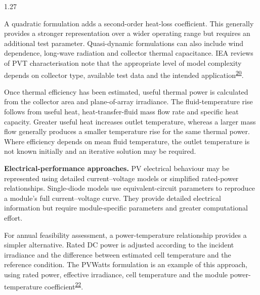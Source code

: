 \documentclass[12pt,letterpaper]{article}
\DeclareRobustCommand{\citenum}[1]{\hyperlink{ref:#1}{#1}} %
\begin{document}
\begin{spacing}{1.27}
\vspace{0.15in}

A quadratic formulation adds a second-order heat-loss coefficient. This generally provides a stronger representation over a wider operating range but requires an additional test parameter. Quasi-dynamic formulations can also include wind dependence, long-wave radiation and collector thermal capacitance. IEA reviews of PVT characterisation note that the appropriate level of model complexity depends on collector type, available test data and the intended application\textsuperscript{\citenum{20}}.\par

\vspace{0.15in}

Once thermal efficiency has been estimated, useful thermal power is calculated from the collector area and plane-of-array irradiance. The fluid-temperature rise follows from useful heat, heat-transfer-fluid mass flow rate and specific heat capacity. Greater useful heat increases outlet temperature, whereas a larger mass flow generally produces a smaller temperature rise for the same thermal power. Where efficiency depends on mean fluid temperature, the outlet temperature is not known initially and an iterative solution may be required.\par

\vspace{0.15in}

\textbf{Electrical-performance approaches.} PV electrical behaviour may be represented using detailed current--voltage models or simplified rated-power relationships. Single-diode models use equivalent-circuit parameters to reproduce a module's full current--voltage curve. They provide detailed electrical information but require module-specific parameters and greater computational effort.\par

\vspace{0.15in}

For annual feasibility assessment, a power-temperature relationship provides a simpler alternative. Rated DC power is adjusted according to the incident irradiance and the difference between estimated cell temperature and the reference condition. The PVWatts formulation is an example of this approach, using rated power, effective irradiance, cell temperature and the module power-temperature coefficient\textsuperscript{\citenum{22}}.\par

\vspace{0.15in}


\end{spacing}
\end{document}
